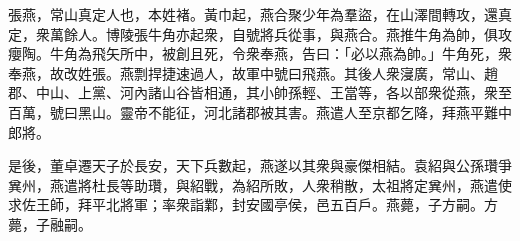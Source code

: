 \begin{pinyinscope}
 
 
 張燕，常山真定人也，本姓褚。黃巾起，燕合聚少年為羣盜，在山澤間轉攻，還真定，衆萬餘人。博陵張牛角亦起衆，自號將兵從事，與燕合。燕推牛角為帥，俱攻癭陶。牛角為飛矢所中，被創且死，令衆奉燕，告曰：「必以燕為帥。」牛角死，衆奉燕，故改姓張。燕剽捍捷速過人，故軍中號曰飛燕。其後人衆寖廣，常山、趙郡、中山、上黨、河內諸山谷皆相通，其小帥孫輕、王當等，各以部衆從燕，衆至百萬，號曰黑山。靈帝不能征，河北諸郡被其害。燕遣人至京都乞降，拜燕平難中郎將。
 
 
 是後，董卓遷天子於長安，天下兵數起，燕遂以其衆與豪傑相結。袁紹與公孫瓚爭兾州，燕遣將杜長等助瓚，與紹戰，為紹所敗，人衆稍散，太祖將定兾州，燕遣使求佐王師，拜平北將軍；率衆詣鄴，封安國亭侯，邑五百戶。燕薨，子方嗣。方薨，子融嗣。
 
 
\end{pinyinscope}